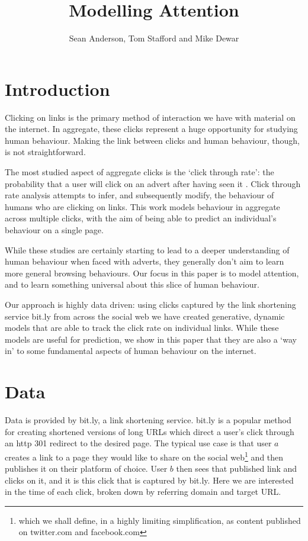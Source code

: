 \documentclass{article}
\title{Modelling Attention}
\author{Sean Anderson, Tom Stafford and Mike Dewar}
\begin{document}
    
    \maketitle
    
    \section{Introduction}
    
    Clicking on links is the primary method of interaction we have with material on the internet. In aggregate, these clicks represent a huge opportunity for studying human behaviour. Making the link between clicks and human behaviour, though, is not straightforward.
    
    The most studied aspect of aggregate clicks is the `click through rate': the probability that a user will click on an advert after having seen it \cite{}. Click through rate analysis attempts to infer, and subsequently modify, the behaviour of humans who are clicking on links. This work models behaviour in aggregate across multiple clicks, with the aim of being able to predict an individual's behaviour on a single page.
    
    
    While these studies are certainly starting to lead to a deeper understanding of human behaviour when faced with adverts, they generally don't aim to learn more general browsing behaviours. Our focus in this paper is to model attention, and to learn something universal about this slice of human behaviour.
    
    Our approach is highly data driven: using clicks captured by the link shortening service bit.ly from across the social web we have created generative, dynamic models that are able to track the click rate on individual links. While these models are useful for prediction, we show in this paper that they are also a `way in' to some fundamental aspects of human behaviour on the internet. 
    
    \section{Data}
    
    Data is provided by bit.ly, a link shortening service. bit.ly is a popular method for creating shortened versions of long URLs which direct a user's click through an http 301 redirect to the desired page. The typical use case is that user $a$ creates a link to a page they would like to share on the social web\footnote{which we shall define, in a highly limiting simplification, as content published on twitter.com and facebook.com} and then publishes it on their platform of choice. User $b$ then sees that published link and clicks on it, and it is this click that is captured by bit.ly. Here we are interested in the time of each click, broken down by referring domain and target URL. 
    
\end{document}
